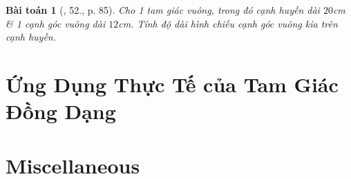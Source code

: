 \documentclass{article}
\newtheorem{baitoan}{Bài toán}
\begin{document}
\begin{baitoan}[\cite{SGK_Toan_8_tap_2}, 52., p. 85]
	Cho 1 tam giác vuông, trong đó cạnh huyền dài $20$\emph{cm} \& 1 cạnh góc vuông dài $12$\emph{cm}. Tính độ dài hình chiếu cạnh góc vuông kia trên cạnh huyền.
\end{baitoan}


\section{Ứng Dụng Thực Tế của Tam Giác Đồng Dạng}


\section{Miscellaneous}


\printbibliography[heading=bibintoc]
	
\end{document}
